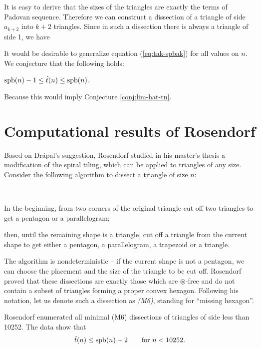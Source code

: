 It is easy to derive that the sizes of the triangles are exactly the terms of Padovan sequence. Therefore we can construct a dissection of a triangle of side $a_{k+2}$ into $k+2$ triangles. Since in such a dissection there is always a triangle of side 1, we have
%

It would be desirable to generalize equation (\ref{eq:tak-spbak}) for all values on $n$. We conjecture that the following holds:
\begin{conj}
\label{conj:spbn}
$\mathop{\mathrm{spb}}(n)-1 \leq \hat t(n) \leq \mathop{\mathrm{spb}}(n)$.
\end{conj}%

\noindent
Because
%
this would imply Conjecture \ref{conj:lim-hat-tn}.

\section{Computational results of Rosendorf}
Based on Drápal's suggestion, Rosendorf studied in his master's thesis \cite{Rosendorf04} a modification of the spiral tiling, which can be applied to triangles of any size. Consider the following algorithm to dissect a triangle of size $n$:

\begin{alg} \ 
	\begin{cosyitemize}
		\item In the beginning, from two corners of the original triangle cut off two triangles to get a pentagon or a parallelogram;
		\item then, until the remaining shape is a triangle, cut off a triangle from the current shape to get either a pentagon, a parallelogram, a trapezoid or a triangle.
	\end{cosyitemize}
\end{alg}%

The algorithm is nondeterministic -- if the current shape is not a pentagon, we can choose the placement and the size of the triangle to be cut off. Rosendorf proved that these dissections are exactly those which are $\circledast$-free and do not contain a subset of triangles forming a proper convex hexagon. Following his notation, let us denote such a dissection as \emph{(M6)}, standing for ``missing hexagon''.

Rosendorf enumerated all minimal (M6) dissections of triangles of side less than 10252. The data show that
\begin{align}
	\hat{t}(n) \leq \mathop{\mathrm{spb}}(n)+2 \qquad\hbox{for $n < 10252$.}
\end{align}

